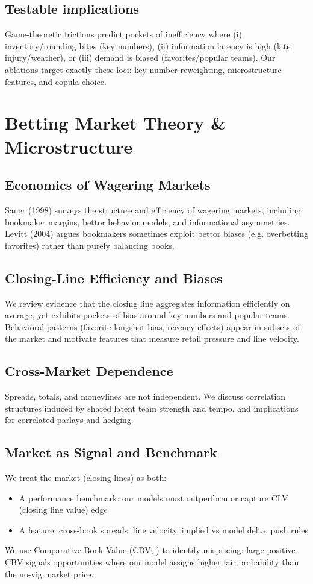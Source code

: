 \subsection{Testable implications}
Game‑theoretic frictions predict pockets of inefficiency where (i) inventory/rounding bites (key numbers), (ii) information latency is high (late injury/weather), or (iii) demand is biased (favorites/popular teams). Our ablations target exactly these loci: key‑number reweighting, microstructure features, and copula choice.
\endgroup

\section{Betting Market Theory \& Microstructure}
\label{sec:market}

\subsection{Economics of Wagering Markets}
Sauer (1998) surveys the structure and efficiency of wagering markets, including bookmaker margins, bettor behavior models, and informational asymmetries. \citep{sauer1998}  
Levitt (2004) argues bookmakers sometimes exploit bettor biases (e.g. overbetting favorites) rather than purely balancing books. \citep{levitt2004}

\subsection{Closing-Line Efficiency and Biases}
We review evidence that the closing line aggregates information efficiently on average, yet exhibits pockets of bias around key numbers and popular teams. Behavioral patterns (favorite-longshot bias, recency effects) appear in subsets of the market and motivate features that measure retail pressure and line velocity.

\subsection{Cross-Market Dependence}
Spreads, totals, and moneylines are not independent. We discuss correlation structures induced by shared latent team strength and tempo, and implications for correlated parlays and hedging.

\subsection{Market as Signal and Benchmark}
We treat the market (closing lines) as both:
\begin{itemize}
  \item A performance benchmark: our models must outperform or capture CLV (closing line value) edge
  \item A feature: cross-book spreads, line velocity, implied vs model delta, push rules
\end{itemize}
We use Comparative Book Value (CBV, ) to identify mispricing: large positive CBV signals opportunities where our model assigns higher fair probability than the no-vig market price.

